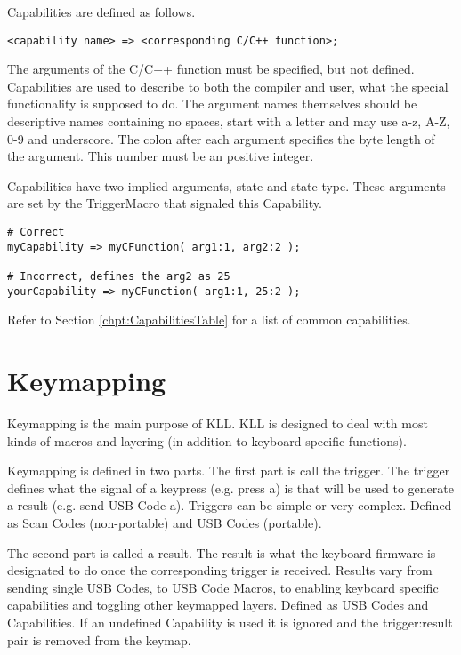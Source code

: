 \documentclass{kiibohd-template}
\begin{document}
Capabilities are defined as follows.

\begin{lstlisting}
<capability name> => <corresponding C/C++ function>;
\end{lstlisting}

The arguments of the C/C++ function must be specified, but not defined.
Capabilities are used to describe to both the compiler and user, what the special functionality is supposed to do.
The argument names themselves should be descriptive names containing no spaces, start with a letter and may use a-z, A-Z, 0-9 and underscore.
The colon after each argument specifies the byte length of the argument.
This number must be an positive integer.

Capabilities have two implied arguments, state and state type.
These arguments are set by the TriggerMacro that signaled this Capability.

\begin{lstlisting}
# Correct
myCapability => myCFunction( arg1:1, arg2:2 );

# Incorrect, defines the arg2 as 25
yourCapability => myCFunction( arg1:1, 25:2 );
\end{lstlisting}

Refer to Section \ref{chpt:CapabilitiesTable} for a list of common capabilities.


\chapter{Keymapping}

Keymapping is the main purpose of KLL.
KLL is designed to deal with most kinds of macros and layering (in addition to keyboard specific functions).

Keymapping is defined in two parts.
The first part is call the trigger.
The trigger defines what the signal of a keypress (e.g. press a) is that will be used to generate a result (e.g. send USB Code a).
Triggers can be simple or very complex.
Defined as Scan Codes (non-portable) and USB Codes (portable).

The second part is called a result.
The result is what the keyboard firmware is designated to do once the corresponding trigger is received.
Results vary from sending single USB Codes, to USB Code Macros, to enabling keyboard specific capabilities and toggling other keymapped layers.
Defined as USB Codes and Capabilities.
If an undefined Capability is used it is ignored and the trigger:result pair is removed from the keymap.
\end{document}
